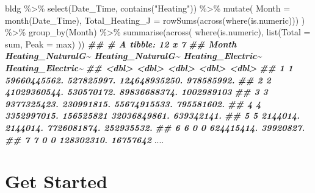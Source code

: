 \documentclass[
]{book}
\newenvironment{Shaded}{\begin{snugshade}}{\end{snugshade}}
\newcommand{\AttributeTok}[1]{\textcolor[rgb]{0.77,0.63,0.00}{#1}}
\newcommand{\DocumentationTok}[1]{\textcolor[rgb]{0.56,0.35,0.01}{\textbf{\textit{#1}}}}
\newcommand{\FunctionTok}[1]{\textcolor[rgb]{0.00,0.00,0.00}{#1}}
\newcommand{\NormalTok}[1]{#1}
\newcommand{\SpecialCharTok}[1]{\textcolor[rgb]{0.00,0.00,0.00}{#1}}
\newcommand{\StringTok}[1]{\textcolor[rgb]{0.31,0.60,0.02}{#1}}
\begin{document}
\begin{Shaded}
\begin{Highlighting}[]

\NormalTok{bldg }\SpecialCharTok{\%\textgreater{}\%}
  \FunctionTok{select}\NormalTok{(Date\_Time, }\FunctionTok{contains}\NormalTok{(}\StringTok{"Heating"}\NormalTok{)) }\SpecialCharTok{\%\textgreater{}\%}
  \FunctionTok{mutate}\NormalTok{(}
    \AttributeTok{Month =} \FunctionTok{month}\NormalTok{(Date\_Time),}
    \AttributeTok{Total\_Heating\_J =} \FunctionTok{rowSums}\NormalTok{(}\FunctionTok{across}\NormalTok{(}\FunctionTok{where}\NormalTok{(is.numeric)))}
\NormalTok{  ) }\SpecialCharTok{\%\textgreater{}\%}
  \FunctionTok{group\_by}\NormalTok{(Month) }\SpecialCharTok{\%\textgreater{}\%}
  \FunctionTok{summarise}\NormalTok{(}\FunctionTok{across}\NormalTok{(}
    \FunctionTok{where}\NormalTok{(is.numeric),}
    \FunctionTok{list}\NormalTok{(}\AttributeTok{Total =}\NormalTok{ sum, }\AttributeTok{Peak =}\NormalTok{ max)}
\NormalTok{  ))}
\DocumentationTok{\#\# \# A tibble: 12 x 7}
\DocumentationTok{\#\#    Month Heating\_NaturalG\textasciitilde{} Heating\_NaturalG\textasciitilde{} Heating\_Electric\textasciitilde{} Heating\_Electric\textasciitilde{}}
\DocumentationTok{\#\#    \textless{}dbl\textgreater{}             \textless{}dbl\textgreater{}             \textless{}dbl\textgreater{}             \textless{}dbl\textgreater{}             \textless{}dbl\textgreater{}}
\DocumentationTok{\#\#  1     1      59660445562.        527825997.     124648935250.        978585992.}
\DocumentationTok{\#\#  2     2      41029360544.        530570172.      89836688374.       1002989103 }
\DocumentationTok{\#\#  3     3       9377325423.        230991815.      55674915533.        795581602.}
\DocumentationTok{\#\#  4     4       3352997015.        156525821       32036849861.        639342141.}
\DocumentationTok{\#\#  5     5          2144014.          2144014.       7726081874.        252935532.}
\DocumentationTok{\#\#  6     6                0                 0         624415414.         39920827.}
\DocumentationTok{\#\#  7     7                0                 0         128302310.         16757642 }
\NormalTok{....}
\end{Highlighting}
\end{Shaded}

\hypertarget{part-get-started}{%
\part{Get Started}\label{part-get-started}}
\end{document}
